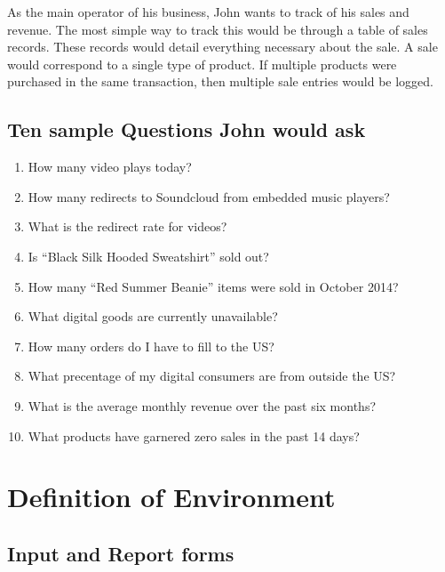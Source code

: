 \documentclass[11pt, a4paper]{report}
\begin{document}
As the main operator of his business, John wants to track of his sales and revenue. The most simple way to track this would be through a table of sales records. These records would detail everything necessary about the sale. A sale would correspond to a single type of product. If multiple products were purchased in the same transaction, then multiple sale entries would be logged.\\

\clearpage
\section{Ten sample Questions John would ask}
\begin{enumerate}
    \item How many video plays today?
    \item How many redirects to Soundcloud from embedded music players?
    \item What is the redirect rate for videos?
    \item Is ``Black Silk Hooded Sweatshirt'' sold out?
    \item How many ``Red Summer Beanie'' items were sold in October 2014?
    \item What digital goods are currently unavailable?
    \item How many orders do I have to fill to the US?
    \item What precentage of my digital consumers are from outside the US?
    \item What is the average monthly revenue over the past six months?
    \item What products have garnered zero sales in the past 14 days? 
\end{enumerate}

\chapter{Definition of Environment}

\section{Input and Report forms}
\end{document}
